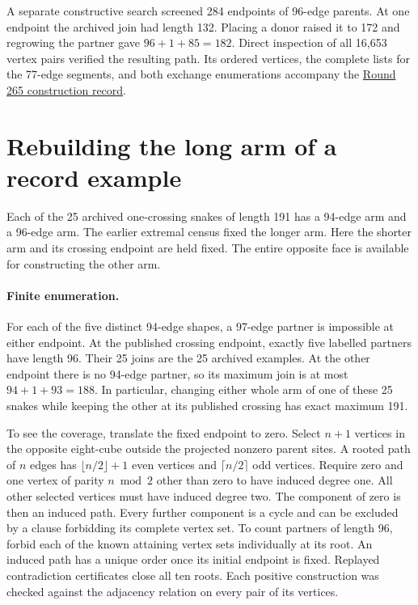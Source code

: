 \documentclass[11pt,a4paper]{article}
\theoremstyle{definition}
\theoremstyle{remark}
\begin{document}
A separate constructive search screened 284 endpoints of 96-edge parents.
At one endpoint the archived join had length 132. Placing a donor raised
it to 172 and regrowing the partner gave $96+1+85=182$. Direct inspection
of all 16,653 vertex pairs verified the resulting path. Its ordered
vertices, the complete lists for the 77-edge segments, and both exchange
enumerations accompany the
\href{https://github.com/hironaka-iori/Snake-in-the-box-in-9/tree/main/milestones/265-joint-arm-regrowth}{Round 265 construction record}.

\section{Rebuilding the long arm of a record example}
Each of the 25 archived one-crossing snakes of length 191 has a 94-edge
arm and a 96-edge arm. The earlier extremal census fixed the longer arm.
Here the shorter arm and its crossing endpoint are held fixed. The entire
opposite face is available for constructing the other arm.

\paragraph{Finite enumeration.}
For each of the five distinct 94-edge shapes, a 97-edge partner is
impossible at either endpoint. At the published crossing endpoint, exactly
five labelled partners have length 96. Their 25 joins are the 25 archived
examples. At the other endpoint there is no 94-edge partner, so its maximum
join is at most $94+1+93=188$. In particular, changing either whole arm of
one of these 25 snakes while keeping the other at its published crossing
has exact maximum 191.

To see the coverage, translate the fixed endpoint to zero. Select $n+1$
vertices in the opposite eight-cube outside the projected nonzero parent
sites. A rooted path of $n$ edges has $\lfloor n/2\rfloor+1$ even vertices
and $\lceil n/2\rceil$ odd vertices. Require zero and one vertex of
parity $n\bmod 2$ other than zero to have induced degree one.
All other selected vertices must have induced degree two. The component
of zero is then an induced path. Every further component is a cycle
and can be excluded by a clause forbidding its complete vertex set.
To count partners of length 96, forbid each of the known attaining
vertex sets individually at its root. An induced path has a unique
order once its initial endpoint is fixed. Replayed contradiction
certificates close all ten roots. Each positive construction was checked
against the adjacency relation on every pair of its vertices.
\end{document}
